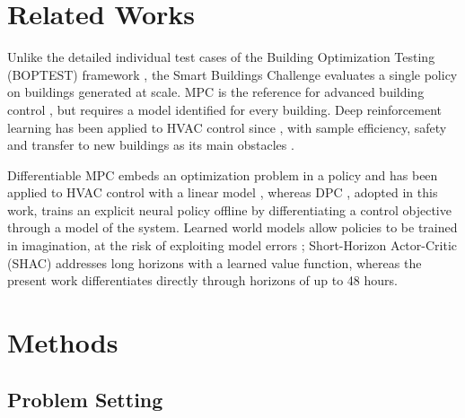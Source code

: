 \documentclass{article}
\begin{document}
\section{Related Works}

Unlike the detailed individual test cases of the Building Optimization Testing (BOPTEST) framework \cite{blum2021boptest}, the Smart Buildings Challenge evaluates a single policy on buildings generated at scale. MPC is the reference for advanced building control \cite{drgona2020mpc}, but requires a model identified for every building. Deep reinforcement learning has been applied to HVAC control since \cite{wei2017drl}, with sample efficiency, safety and transfer to new buildings as its main obstacles \cite{wang2020rl,pinto2022transfer}.

Differentiable MPC \cite{amos2018diffmpc} embeds an optimization problem in a policy and has been applied to HVAC control with a linear model \cite{chen2019gnurl}, whereas DPC \cite{drgona2022dpc}, adopted in this work, trains an explicit neural policy offline by differentiating a control objective through a model of the system. Learned world models \cite{ha2018world,hafner2020dreamer} allow policies to be trained in imagination, at the risk of exploiting model errors \cite{janner2019mbpo}; Short-Horizon Actor-Critic (SHAC) \cite{xu2022shac} addresses long horizons with a learned value function, whereas the present work differentiates directly through horizons of up to 48 hours.

\section{Methods}

\subsection{Problem Setting}
\end{document}
